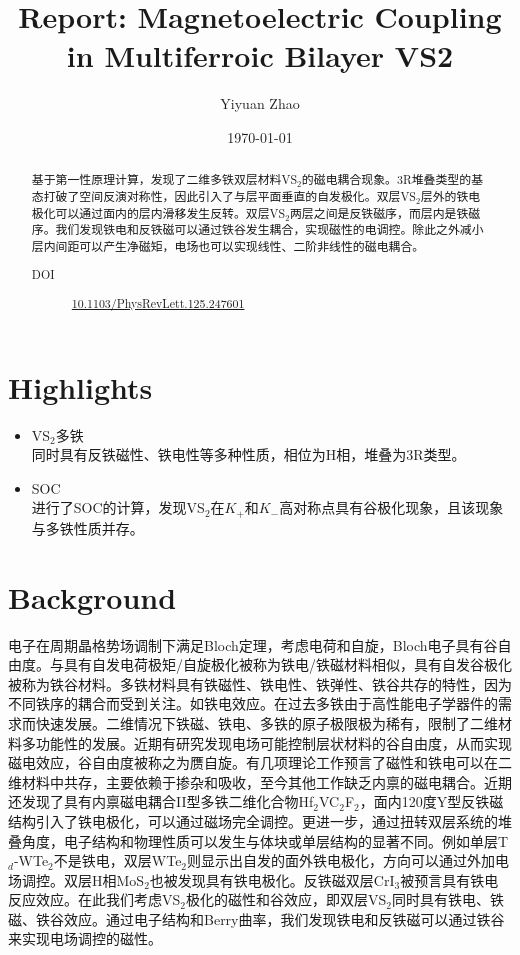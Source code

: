 \documentclass[reprint, aps, prb, showkeys]{revtex4-2}
\begin{document}
\title{Report: Magnetoelectric Coupling in Multiferroic Bilayer VS2}

\author{Yiyuan Zhao}
\date{\today}

\begin{abstract}
基于第一性原理计算，发现了二维多铁双层材料VS$_2$的磁电耦合现象。3R堆叠类型的基态打破了空间反演对称性，因此引入了与层平面垂直的自发极化。双层VS$_2$层外的铁电极化可以通过面内的层内滑移发生反转。双层VS$_2$两层之间是反铁磁序，而层内是铁磁序。我们发现铁电和反铁磁可以通过铁谷发生耦合，实现磁性的电调控。除此之外减小层内间距可以产生净磁矩，电场也可以实现线性、二阶非线性的磁电耦合。
\begin{description}
    \item[DOI] \url{10.1103/PhysRevLett.125.247601}
\end{description}
\end{abstract}


\maketitle
\section{Highlights}
\begin{itemize}
    \item VS$_2$多铁 \\
    同时具有反铁磁性、铁电性等多种性质，相位为H相，堆叠为3R类型。
    \item SOC \\
    进行了SOC的计算，发现VS$_2$在$K_{+}$和$K_{-}$高对称点具有谷极化现象，且该现象与多铁性质并存。
\end{itemize}

\section{Background}
电子在周期晶格势场调制下满足Bloch定理，考虑电荷和自旋，Bloch电子具有谷自由度。与具有自发电荷极矩/自旋极化被称为铁电/铁磁材料相似，具有自发谷极化被称为铁谷材料。多铁材料具有铁磁性、铁电性、铁弹性、铁谷共存的特性，因为不同铁序的耦合而受到关注。如铁电效应。在过去多铁由于高性能电子学器件的需求而快速发展。二维情况下铁磁、铁电、多铁的原子极限极为稀有，限制了二维材料多功能性的发展。近期有研究发现电场可能控制层状材料的谷自由度，从而实现磁电效应，谷自由度被称之为赝自旋。有几项理论工作预言了磁性和铁电可以在二维材料中共存，主要依赖于掺杂和吸收，至今其他工作缺乏内禀的磁电耦合。近期还发现了具有内禀磁电耦合II型多铁二维化合物Hf$_2$VC$_2$F$_2$，面内120度Y型反铁磁结构引入了铁电极化，可以通过磁场完全调控。更进一步，通过扭转双层系统的堆叠角度，电子结构和物理性质可以发生与体块或单层结构的显著不同。例如单层T$_d$-WTe$_2$不是铁电，双层WTe$_2$则显示出自发的面外铁电极化，方向可以通过外加电场调控。双层H相MoS$_2$也被发现具有铁电极化。反铁磁双层CrI$_3$被预言具有铁电反应效应。在此我们考虑VS$_2$极化的磁性和谷效应，即双层VS$_2$同时具有铁电、铁磁、铁谷效应。通过电子结构和Berry曲率，我们发现铁电和反铁磁可以通过铁谷来实现电场调控的磁性。
\end{document}
